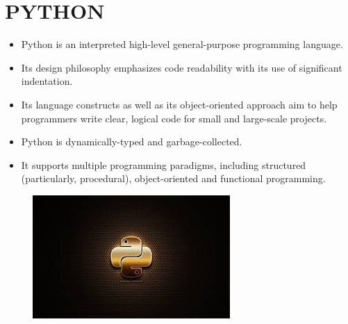 \documentclass{article}
\begin{document}
\section*{PYTHON}
\begin{itemize}
	\item Python is an interpreted high-level general-purpose programming language. 
	\item Its design philosophy emphasizes code readability with its use of significant indentation. 
	\item Its language constructs as well as its object-oriented approach aim to help programmers write clear, logical code for small and large-scale projects.
	\item Python is dynamically-typed and garbage-collected.
	\item It supports multiple programming paradigms, including structured (particularly, procedural), object-oriented and functional programming.
\end{itemize}
\begin{figure}
		\begin{center}
	\includegraphics[width=0.8\linewidth]{python.jpg}
\end{center}
\end{figure}
\newpage
\end{document}
